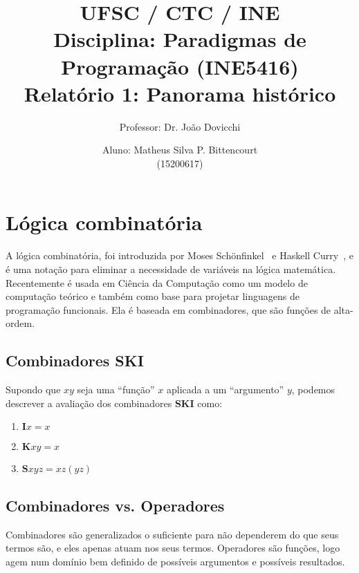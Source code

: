 \documentclass[letterpaper,twocolumn,10pt]{article}
\begin{document}
\title{
	\large \rm UFSC / CTC / INE\\
	\large \rm Disciplina: Paradigmas de Programação (INE5416)\\
	\Large \bf Relatório 1: Panorama histórico
}

\author{
	Professor: Dr. João Dovicchi\\
	\and
	Aluno: Matheus Silva P. Bittencourt\\(15200617)
}

\maketitle

\thispagestyle{empty} %

\section{Lógica combinatória}

A lógica combinatória, foi introduzida por Moses Schönfinkel~\cite{Schonfinkel}
e Haskell Curry~\cite{Curry}, e é uma notação para eliminar a necessidade de
variáveis na lógica matemática. Recentemente é usada em Ciência da Computação
como um modelo de computação teórico e também como base para projetar
linguagens de programação funcionais. Ela é baseada em combinadores, que são
funções de alta-ordem.

\subsection*{Combinadores SKI}

Supondo que \(xy\) seja uma ``função'' \(x\) aplicada a um ``argumento'' \(y\),
podemos descrever a avaliação dos combinadores \textbf{SKI} como:

\begin{enumerate}
	\item \(\mathbf{I}x = x\)
	\item \(\mathbf{K}xy = x\)
	\item \(\mathbf{S}xyz = xz(yz)\)
\end{enumerate}

\subsection*{Combinadores vs. Operadores}

Combinadores são generalizados o suficiente para não dependerem do que seus
termos são, e eles apenas atuam nos seus termos. Operadores são funções, logo
agem num domínio bem definido de possíveis argumentos e possíveis resultados.
\end{document}
